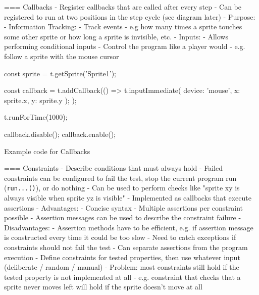 === Callbacks
- Register callbacks that are called after every step
- Can be registered to run at two positions in the step cycle (see diagram later)
- Purpose:
    - Information Tracking:
        - Track events
        - e.g how many times a sprite touches some other sprite
              or how long a sprite is invisible, etc.
    - Inputs:
        - Allows performing conditional inputs
        - Control the program like a player would
        - e.g. follow a sprite with the mouse cursor

\begin{listing}[ht]
    \centering
    \begin{javascriptcode}
        const sprite = t.getSprite('Sprite1');

        const callback = t.addCallback(() => {
            t.inputImmediate({
                device: 'mouse',
                x: sprite.x,
                y: sprite.y
            });
        });

        t.runForTime(1000);

        callback.disable();
        callback.enable();
    \end{javascriptcode}
    \vspace{-\bigskipamount}
    \caption{Example code for Callbacks}
    \label{fig:example_code_for_callbacks}
\end{listing}


=== Constraints
- Describe conditions that must always hold
- Failed constraints can be configured to fail the test, stop the current program run (\texttt{run...()}), or do nothing
- Can be used to perform checks like "sprite xy is always visible when sprite yz is visible"
- Implemented as callbacks that execute assertions
    - Advantages:
        - Concise syntax
        - Multiple assertions per constraint possible
        - Assertion messages can be used to describe the constraint failure
    - Disadvantages:
        - Assertion methods have to be efficient, e.g. if assertion message is constructed every time it could be too slow
        - Need to catch exceptions if constraints should not fail the test
- Can separate assertions from the program execution
    - Define constraints for tested properties, then use whatever input (deliberate / random / manual)
    - Problem: most constraints still hold if the tested property is not implemented at all
        - e.g. constraint that checks that a sprite never moves left will hold if the sprite doesn't move at all

